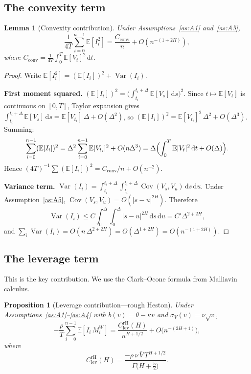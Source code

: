 \documentclass[12pt]{article}
\newtheorem{proposition}[theorem]{Proposition}
\newtheorem{lemma}[theorem]{Lemma}
\theoremstyle{definition}
\DeclareMathOperator{\Var}{Var}
\DeclareMathOperator{\Cov}{Cov}
\newcommand{\E}{\mathbb{E}}
\newcommand{\dd}{\mathrm{d}}
\begin{document}
\subsection{The convexity term}

\begin{lemma}[Convexity contribution]\label{lem:convexity}
Under Assumptions~\ref{as:A1} and~\ref{as:A5},
\begin{equation}\label{eq:convexity-result}
  \frac{1}{4T}\sum_{i=0}^{n-1} \E[I_i^2]
  = \frac{C_{\mathrm{conv}}}{n}
  + O(n^{-(1+2H)}),
\end{equation}
where
$C_{\mathrm{conv}} = \frac{1}{4T}\int_0^T \E[V_t]^2\,\dd t$.
\end{lemma}

\begin{proof}
Write $\E[I_i^2] = (\E[I_i])^2 + \Var(I_i)$.

\textbf{First moment squared.}
$(\E[I_i])^2 = \bigl(\int_{t_i}^{t_i+\Delta}\E[V_s]\,\dd s\bigr)^2$.
Since $t \mapsto \E[V_t]$ is continuous on $[0,T]$,
Taylor expansion gives
$\int_{t_i}^{t_i+\Delta}\!\E[V_s]\,\dd s
= \E[V_{t_i}]\,\Delta + O(\Delta^2)$,
so $(\E[I_i])^2 = \E[V_{t_i}]^2\,\Delta^2 + O(\Delta^3)$.
Summing:
\[
  \sum_{i=0}^{n-1} (\E[I_i])^2
  = \Delta^2 \sum_{i=0}^{n-1} \E[V_{t_i}]^2 + O(n\Delta^3)
  = \Delta\Bigl(\int_0^T \E[V_t]^2\,\dd t + O(\Delta)\Bigr).
\]
Hence $(4T)^{-1}\sum(\E[I_i])^2 = C_{\mathrm{conv}}/n + O(n^{-2})$.

\textbf{Variance term.}
$\Var(I_i) = \int_{t_i}^{t_i+\Delta}\!\!\int_{t_i}^{t_i+\Delta}
\Cov(V_s, V_u)\,\dd s\,\dd u$.
Under Assumption~\ref{as:A5},
$\Cov(V_s, V_u) = O(|s{-}u|^{2H})$.
Therefore
\[
  \Var(I_i) \le C \int_0^\Delta\!\!\int_0^\Delta
  |s-u|^{2H}\,\dd s\,\dd u
  = C' \Delta^{2+2H},
\]
and $\sum_i \Var(I_i) = O(n\,\Delta^{2+2H})
= O(\Delta^{1+2H}) = O(n^{-(1+2H)})$.
\end{proof}

\subsection{The leverage term}\label{sec:leverage-rh}

This is the key contribution. We use the Clark--Ocone formula
from Malliavin calculus.

\begin{proposition}[Leverage contribution---rough Heston]
\label{prop:leverage-rh}
Under Assumptions~\ref{as:A1}--\ref{as:A4} with
$b(v) = \theta - \kappa v$ and $\sigma_V(v) = \nu\sqrt{v}$,
\begin{equation}\label{eq:leverage-rh}
  -\frac{\rho}{T}\sum_{i=0}^{n-1}\E[I_i\, M_i^W]
  = \frac{C_{\mathrm{lev}}^{\mathrm{rH}}(H)}{n^{H+1/2}}
  + O\bigl(n^{-(2H+1)}\bigr),
\end{equation}
where
\begin{equation}\label{eq:Clev-rh}
  C_{\mathrm{lev}}^{\mathrm{rH}}(H)
  = \frac{-\rho\,\nu\,\bar V\,T^{H+1/2}}
         {\Gamma\bigl(H + \tfrac52\bigr)}.
\end{equation}
\end{proposition}
\end{document}
